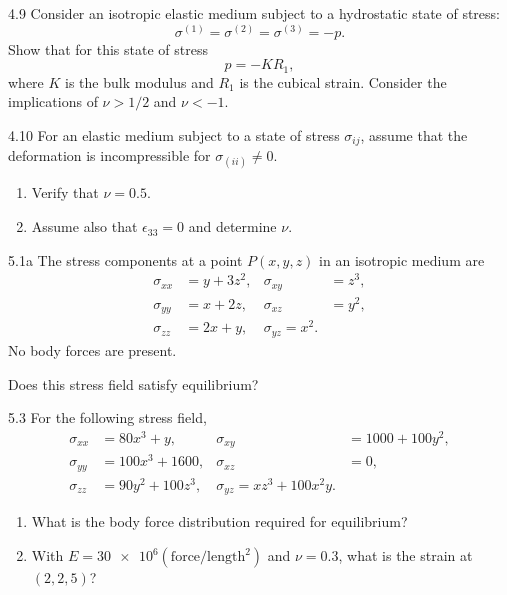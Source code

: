 
\begin{problem}{4.9}
  Consider an isotropic elastic medium subject to a hydrostatic state of stress:
  \begin{equation*}
    \sigma^{(1)} = \sigma^{(2)} = \sigma^{(3)} = -p
  .\end{equation*}
  Show that for this state of stress
  \begin{equation*}
    p = -KR_1
  ,\end{equation*}
  where $K$ is the bulk modulus and $R_1$ is the cubical strain.
  Consider the implications of $\nu > 1 / 2$ and $\nu < -1$.
\end{problem}

\begin{problem}{4.10}
  For an elastic medium subject to a state of stress $\sigma_{ij}$, assume that the deformation is incompressible for $\sigma_{(ii)} \neq 0$.
  \begin{enumerate}[label=(\alph*)]
    \item Verify that $\nu = \num{0,5}$.
    \item Assume also that $\epsilon_{33} = 0$ and determine $\nu$.
  \end{enumerate}
\end{problem}

\begin{problem}{5.1a}
  The stress components at a point $P(x,y,z)$ in an isotropic medium are
  \begin{align*}
    \sigma_{x x} &= y + 3z^2, & \sigma_{xy} &= z^3, \\
    \sigma_{yy} &= x + 2z, & \sigma_{xz} &= y^2, \\
    \sigma_{zz} &= 2x + y, & \sigma_{yz} = x^2
  .\end{align*}
  No body forces are present.

  Does this stress field satisfy equilibrium?
\end{problem}

\begin{problem}{5.3}
  For the following stress field,
  \begin{align*}
    \sigma_{x x} &= 80x^3 + y, & \sigma_{xy} &= \num{1000} + \num{100} y^2 , \\
    \sigma_{yy} &= \num{100} x^3 + \num{1600} , & \sigma_{xz} &= 0, \\
    \sigma_{zz} &= \num{90} y^2 + \num{100} z^3, & \sigma_{yz} = xz^3 + \num{100} x^2 y
  .\end{align*}

  \begin{enumerate}
    \item[(a)] What is the body force distribution required for equilibrium?
    \item[(c)] With $E = \num{30e6} (\text{force}/\text{length}^2)$ and $\nu = \num{0,3}$, what is the strain at $(2,2,5)$?
  \end{enumerate}
\end{problem}
